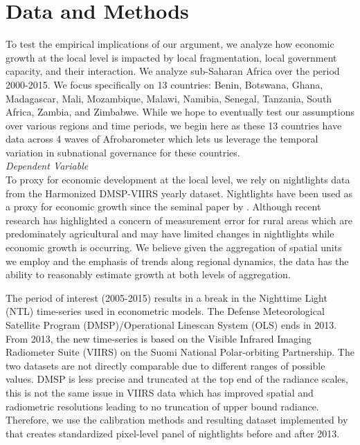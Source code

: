\documentclass[11pt]{article}
\begin{document}
\section{Data and Methods}
To test the empirical implications of our argument, we analyze how economic growth at the local level is impacted by local fragmentation, local government capacity, and their interaction. We analyze sub-Saharan Africa over the period 2000-2015.  We focus specifically on 13 countries: Benin, Botswana, Ghana, Madagascar, Mali, Mozambique, Malawi, Namibia, Senegal, Tanzania, South Africa, Zambia, and Zimbabwe. While we hope to eventually test our assumptions over various regions and time periods, we begin here as these 13 countries have data across 4 waves of Afrobarometer which lets us leverage the temporal variation in subnational governance for these countries. \vspace{.5cm} \\ 
\textit{Dependent Variable}\\
To proxy for economic development at the local level, we rely on nightlights data from the Harmonized DMSP-VIIRS yearly dataset.  Nightlights have been used as a proxy for economic growth since the seminal paper by \cite{henderson_measuring_2012}. Although recent research has highlighted a concern of measurement error for rural areas which are predominately agricultural and may have limited changes in nightlights while economic growth is occurring\citep{gibson_which_2021}. We believe given the aggregation of spatial units we employ and the emphasis of trends along regional dynamics, the data has the ability to reasonably estimate growth at both levels of aggregation. 

The period of interest (2005-2015) results in a break in the Nighttime Light (NTL) time-series used in econometric models. The Defense Meteorological Satellite Program (DMSP)/Operational Linescan System (OLS) ends in 2013. From 2013, the new time-series is based on the Visible Infrared Imaging Radiometer Suite (VIIRS) on the Suomi National Polar-orbiting Partnership. The two datasets are not directly comparable due to different ranges of possible values. DMSP is less precise and truncated at the top end of the radiance scales, this is not the same issue in VIIRS data which has improved spatial and radiometric resolutions leading to no truncation of upper bound radiance. Therefore, we use the calibration methods and resulting dataset implemented by \cite{regan_illuminating_2023} that creates standardized pixel-level panel of nightlights before and after 2013. 
        
\end{document}
